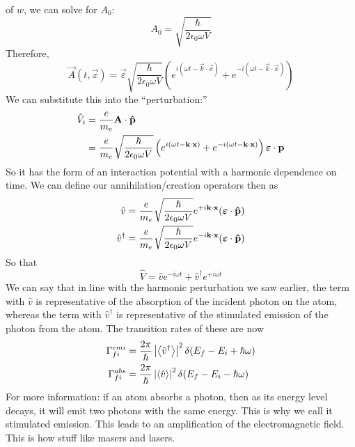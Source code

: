 \documentclass[a4paper]{article}
\begin{document}
of $w$, we can solve for $A_0$:
\[ A_0 = \sqrt{\frac{\hslash}{2\epsilon_0\omega V}} \]
Therefore,
\[
	\vec{A}(t,\vec{x}) =
		\vec{\varepsilon}\sqrt{\frac{\hslash}{2\epsilon_0\omega V}}
		\left(
			e^{i(\omega t-\vec{k}\cdot\vec{x})} +
			e^{-i(\omega t-\vec{k}\cdot\vec{x})}
		\right)
\]
We can substitute this into the ``perturbation:''
\begin{align*}
	\hat{V}_i &= \frac{e}{m_e}\boldsymbol{\mathbf{A}}\cdot\boldsymbol{\mathbf{\hat{p}}}\\
		  &= \frac{e}{m_e}\sqrt{\frac{\hslash}{2\epsilon_0\omega V}}
			\left(
				e^{i(\omega t-\boldsymbol{\mathbf{k}}\cdot\boldsymbol{\mathbf{x}})} +
				e^{-i(\omega t-\boldsymbol{\mathbf{k}}\cdot\boldsymbol{\mathbf{x}})}
			\right) \boldsymbol{\mathbf{\varepsilon}}\cdot\boldsymbol{\mathbf{p}}
\end{align*}
So it has the form of an interaction potential with a  harmonic dependence on
time. We can define our annihilation/creation operators then as
\begin{align*}
	\hat{v} &= \frac{e}{m_e}
		\sqrt{\frac{\hslash}{2\epsilon_0\omega V}}
		e^{+i\boldsymbol{\mathbf{k}}\cdot\boldsymbol{\mathbf{x}}}(\boldsymbol{\mathbf{\varepsilon}}\cdot\boldsymbol{\mathbf{\hat{p}}})\\
	\hat{v}^\dagger &= \frac{e}{m_e}
		\sqrt{\frac{\hslash}{2\epsilon_0\omega V}}
		e^{-i\boldsymbol{\mathbf{k}}\cdot\boldsymbol{\mathbf{x}}}(\boldsymbol{\mathbf{\varepsilon}}\cdot\boldsymbol{\mathbf{\hat{p}}})
\end{align*}
So that
\[
	\hat{V} = \hat{v}e^{-i\omega t} + \hat{v}^\dagger e^{+i\omega t}
\]
We can say that in line with the harmonic perturbation we saw earlier,
the term with $\hat{v}$ is representative of the absorption of the incident
photon on the atom, whereas the term with $\hat{v}^\dagger$ is representative
of the stimulated emission of the photon from the atom. The transition rates
of these are now
\begin{align*}
	\Gamma_{fi}^{emi} &= \frac{2\pi}{\hslash}
		\left\lvert \left\langle \hat{v}^\dagger\right\rangle\right\rvert^2
		\delta(E_f-E_i+\hslash\omega)\\
	\Gamma_{fi}^{abs} &= \frac{2\pi}{\hslash}
		\left\lvert \left\langle \hat{v}\right\rangle\right\rvert^2
		\delta(E_f-E_i-\hslash\omega)
\end{align*}
For more information: if an atom absorbs a photon, then as its energy level
decays, it will emit two photons with the same energy. This is why we call it
stimulated emission. This leads to an amplification of the electromagnetic
field. This is how stuff like masers and lasers.
\end{document}

